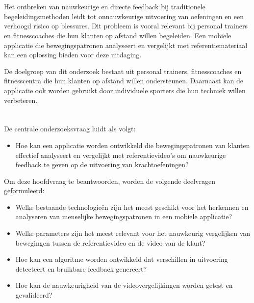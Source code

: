 \medskip

\section{}%
\label{sec:probleemstelling}

Het ontbreken van nauwkeurige en directe feedback bij traditionele begeleidingsmethoden leidt tot onnauwkeurige uitvoering van oefeningen en een verhoogd risico op blessures. Dit probleem is vooral relevant bij personal trainers en fitnesscoaches die hun klanten op afstand willen begeleiden. Een mobiele applicatie die bewegingspatronen analyseert en vergelijkt met referentiemateriaal kan een oplossing bieden voor deze uitdaging.

\medskip

De doelgroep van dit onderzoek bestaat uit personal trainers, fitnesscoaches en fitnesscentra die hun klanten op afstand willen ondersteunen. Daarnaast kan de applicatie ook worden gebruikt door individuele sporters die hun techniek willen verbeteren.

\section{}%
\label{sec:onderzoeksvraag}

De centrale onderzoeksvraag luidt als volgt:

\begin{itemize}
    \item Hoe kan een applicatie worden ontwikkeld die bewegingspatronen van \mbox{klanten} effectief analyseert en vergelijkt met referentievideo’s om \mbox{nauwkeurige} feedback te geven op de uitvoering van krachtoefeningen?  
\end{itemize}

Om deze hoofdvraag te beantwoorden, worden de volgende deelvragen \mbox{geformuleerd}:

\begin{itemize}
    \item Welke bestaande technologieën zijn het meest geschikt voor het herkennen en analyseren van menselijke bewegingspatronen in een mobiele applicatie?
    \item Welke parameters zijn het meest relevant voor het nauwkeurig vergelijken van bewegingen tussen de referentievideo en de video van de klant?
    \item Hoe kan een algoritme worden ontwikkeld dat verschillen in uitvoering \mbox{detecteert} en bruikbare feedback genereert?
    \item Hoe kan de nauwkeurigheid van de videovergelijkingen worden getest en \mbox{gevalideerd}?
\end{itemize}

